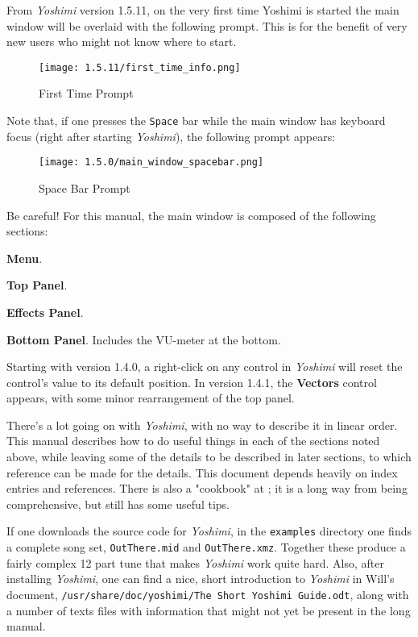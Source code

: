\documentclass[
 11pt,
 twoside,
 a4paper,
 final                                 %
]{article}
\begin{document}
    From \textsl{Yoshimi} version 1.5.11, on the very first time Yoshimi is
    started the main window will be overlaid with the following prompt. This
    is for the benefit of very new users who might not know where to start.

\begin{figure}[H]
   \centering
   \texttt{[image: 1.5.11/first\_time\_info.png]}
   \caption{First Time Prompt}
   \label{fig:first_time_info}
\end{figure}


   Note that, if one presses the \texttt{Space} bar while the main window has
   keyboard focus (right after starting \textsl{Yoshimi}), the following prompt
   appears:

\begin{figure}[H]
   \centering
   \texttt{[image: 1.5.0/main\_window\_spacebar.png]}
   \caption{Space Bar Prompt}
   \label{fig:yoshimi_main_spacebar_prompt}
\end{figure}

   Be careful!
   For this manual, the main window is composed of the following sections:

\begin{enumber}
   \item \textbf{Menu}.
   \item \textbf{Top Panel}.
   \item \textbf{Effects Panel}.
   \item \textbf{Bottom Panel}.  Includes the VU-meter at the bottom.
\end{enumber}

   Starting with version 1.4.0, a right-click on any control in \textsl{Yoshimi}
   will reset the control's value to its default position.  In version 1.4.1, the \textbf{Vectors} control appears, with some minor rearrangement of the top panel.

   There's a lot going on with \textsl{Yoshimi}, with no way to describe
   it in linear order.  This manual describes how to do useful things in
   each of the sections noted above, while leaving some of the details to be
   described in later sections, to which reference can be made for the details.
   This document depends heavily on index entries and references.
   There is also a "cookbook" at \cite{book}; it is a long way from being
   comprehensive, but still has some useful tips.

   If one downloads the source code for \textsl{Yoshimi}, in the
   \texttt{examples} directory one finds a complete song set,
   \texttt{OutThere.mid} and \texttt{OutThere.xmz}. Together these produce a
   fairly complex 12 part tune that makes \textsl{Yoshimi} work quite hard.
   Also, after installing \textsl{Yoshimi}, one can find a nice, short
   introduction to \textsl{Yoshimi} in Will's document,
   \texttt{/usr/share/doc/yoshimi/The Short Yoshimi Guide.odt},
   along with a number of texts files with information that might not yet be
   present in the long manual.
\end{document}
